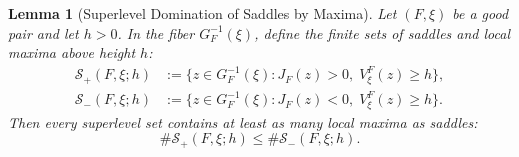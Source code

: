 \documentclass[12pt]{article}
\def\S{\mathcal{S}}
\newtheorem{lemma}[thm]{Lemma}
\theoremstyle{definition}
\numberwithin{equation}{section}
\begin{document}
\begin{lemma}[Superlevel Domination of Saddles by Maxima]\label{lem:superlevel-count}
Let $(F, \xi)$ be a good pair and let $h > 0$. In the fiber $G_F^{-1}(\xi)$, define the finite sets of saddles and local maxima above height $h$:
\begin{equation}\label{eq:fiber-saddles-maxima}
\begin{aligned}
  \S_+(F, \xi; h) &:= \big\{z \in G_F^{-1}(\xi) : J_F(z) > 0,\; V_\xi^F(z) \ge h\big\}, \\
  \S_-(F, \xi; h) &:= \big\{z \in G_F^{-1}(\xi) : J_F(z) < 0,\; V_\xi^F(z) \ge h\big\}.
\end{aligned}
\end{equation}
Then every superlevel set contains at least as many local maxima as saddles:
\begin{equation}\label{eq:superlevel-ineq}
  \# \S_+(F, \xi; h) \le \# \S_-(F, \xi; h).
\end{equation}
\end{lemma}
\end{document}
